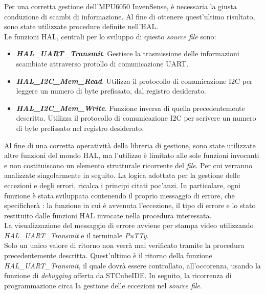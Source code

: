 Per una corretta gestione dell'MPU6050 InvenSense, è necessaria la giusta conduzione di scambi di informazione. Al fine di ottenere quest'ultimo risultato, sono state utilizzate procedure definite nell'HAL.\\
Le funzioni HAL, centrali per lo sviluppo di questo \textit{source file} sono:
\begin{itemize}
\item \textbf{\textit{HAL\_UART\_Transmit}}. Gestisce la trasmissione delle informazioni scambiate attraverso protollo di comunicazione UART.
\item \textbf{\textit{HAL\_I2C\_Mem\_Read}}. Utilizza il protocollo di comunicazione I2C per leggere un numero di byte prefissato, dal registro desiderato.
\item \textbf{\textit{HAL\_I2C\_Mem\_Write}}. Funzione inversa di quella precedentemente descritta. Utilizza il protocollo di comunicazione I2C per scrivere un numero di byte prefissato nel registro desiderato.
\end{itemize}
Al fine di una corretta operatività della libreria di gestione, sono state utilizzate altre funzioni del mondo HAL, ma l'utilizzo è limitato alle sole funzioni invocanti e non costituiscono un elemento strutturale ricorrente del \textit{file}.
Per cui verranno analizzate singolarmente in seguito.
La logica adottata per la gestione delle eccezioni e degli errori, ricalca i principi citati poc'anzi. In particolare, ogni funzione è stata sviluppata contenendo il proprio messaggio di errore, che specificherà : la funzione in cui è avvenuta l'eccezione, il tipo di errore e lo stato restituito dalle funzioni HAL invocate nella procedura interessata.\\
La visualizzazione del messaggio di errore avviene per stampa video utilizzando\\\textit{HAL\_UART\_Transmit} e il terminale \textit{PuTTy}.\\
Solo un unico valore di ritorno non verrà mai verificato tramite la procedura precedentemente descritta. Quest'ultimo è il ritorno della funzione \textit{HAL\_UART\_Transmit}, il quale dovrà essere controllato, all'occorenza, usando la funzione di \textit{debugging} offerta da STCubeIDE.
In seguito, la ricorrenza di programmazione circa la gestione delle eccezioni nel \textit{source file}.\\


